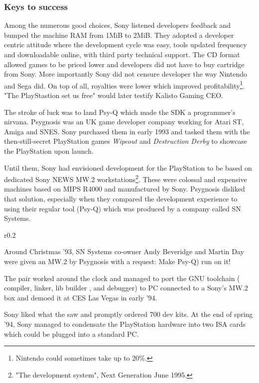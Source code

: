\subsubsection{Keys to success}
\par
 Among the numerous good choices, Sony listened developers feedback and bumped the machine RAM from 1MiB to 2MiB.  They adopted a developer centric attitude where the development cycle was easy, tools updated frequency and downloadable online, with third party technical support. The CD format allowed games to be priced lower and developers did not have to buy cartridge from Sony. More importantly Sony did not censure developer the way Nintendo and Sega did. On top of all, royalties were lower which improved profitability\footnote{Nintendo could sometimes take up to 20\%.}. "The PlayStastion set us free" would later testify Kalisto Gaming CEO.\\
\par
The stroke of luck was to land Psy-Q which made the SDK a programmer's nirvana. Psygnosis was an UK game developer company working for Atari ST, Amiga and SNES. Sony purchased them in early 1993 and tasked them with the then-still-secret PlayStation games \textit{Wipeout} and \textit{Destruction Derby} to showcase the PlayStation upon launch.\\
\par
Until them, Sony had envisioned development for the PlayStation to be based on dedicated Sony NEWS MW.2 workstations\footnote{"The development system", Next Generation June 1995.}. These were colossal and expensive machines based on MIPS R4000 and manufactured by Sony. Psygnosis disliked that solution, especially when they compared the development experience to using their regular tool (Psy-Q) which was produced by a company called SN Systems.\\
\par
\begin{wrapfigure}[10]{r}{0.2\textwidth}{
\centering {}}
\end{wrapfigure}
Around Christmas '93, SN Systems co-owner Andy Beveridge and Martin Day were given an MW.2 by Psygnosis with a request: Make Psy-Q) run on it!\\
\par
 The pair worked around the clock and managed to port the GNU toolchain ( compiler,  linker, lib builder , and  debugger) to PC connected to a Sony's MW.2 box and demoed it at CES Las Vegas in early '94.\\
\par
 Sony liked what the saw and promptly ordered 700 dev kits. At the end of spring '94, Sony managed to condensate the PlayStation hardware into two ISA cards which could be plugged into a standard PC.\\

